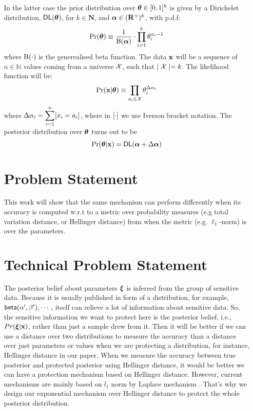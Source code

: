 \documentclass[sigconf, anonymous]{acmart}
\begin{document}
In the latter case the prior distribution over $\boldsymbol{\theta}\in [0,1]^{k}$ is given by a Dirichelet distribution, $\mathsf{DL}(\boldsymbol{\theta})$, for $k\in\mathbf{N}$,
and $\boldsymbol{\alpha}\in(\mathbf{R^{+}})^{k}$, with p.d.f:
\[
  \Pr(\boldsymbol{\theta})\equiv\frac{1}{\boldsymbol{\textup{B}}(\boldsymbol{\alpha})}\cdot \displaystyle\prod_{i=1}^{k}{\theta_i^{\alpha_i-1}}
\]
where $\boldsymbol{\textup{B}}(\cdot)$ is the generealised beta function.
The data $\textbf{x}$ will be a sequence of $n\in\mathbb{N}$ values coming from a universe $\mathcal{X}$, such that $\mid\mathcal{X} \mid=k$.
The likelihood function will be:
\[
  \Pr(\textbf{x}|\boldsymbol{\theta})\equiv \displaystyle\prod_{a_i\in\mathcal{X}}\theta_{i}^{\Delta \alpha_i}
\]
where $\Delta \alpha_i=\displaystyle\sum_{i=1}^{n}[x_i=a_i]$, where in $[\cdot]$ we use
Iverson bracket notation. The posterior distribution over $\boldsymbol{\theta}$ turns out to be
\[
  \Pr(\boldsymbol{\theta}|\textbf{x})=\mathsf{DL}(\boldsymbol{\alpha}+\Delta \boldsymbol{\alpha})
\]
\section{Problem Statement}
This work will show that the same mechanism can
perform differently when its accuracy is computed w.r.t to a metric
over probability measures (e.g total variation distance, or Hellinger distance)
from when the metric (e.g. $\ell_1$-norm) is over the parameters.  
\section{Technical Problem Statement}
\label{sec_bayesInfer}
The posterior belief about parameters $\boldsymbol{\xi}$ is inferred from the
group of sensitive data. Because it is usually published in form of a
distribution, for example, $\mathsf{beta}(\alpha',\beta'), \cdots,$ itself
can relieve a lot of information about sensitive data. So, the
sensitive information we want to protect here is the posterior belief,
i.e., $Pr(\boldsymbol{\xi} | \textbf{x})$, rather than just a sample drew from
it\cite{foulds2016theory}. Then it will be better if we can use a
distance over two distributions to measure the accuracy than a
distance over just parameters or values when we are protecting a
distribution, for instance, Hellinger distance in our paper. When we
measure the accuracy between true posterior and protected posterior
using Hellinger distance, it would be better we can have a protection
mechanism based on Hellinger distance. However, current mechanisms are
mainly based on $l_1$ norm by Laplace mechanism
\cite{zhang2016differential} \cite{xiao2012bayesian}. That's why we
design our exponential mechanism over Hellinger distance to protect
the whole posterior distribution.
\end{document}
